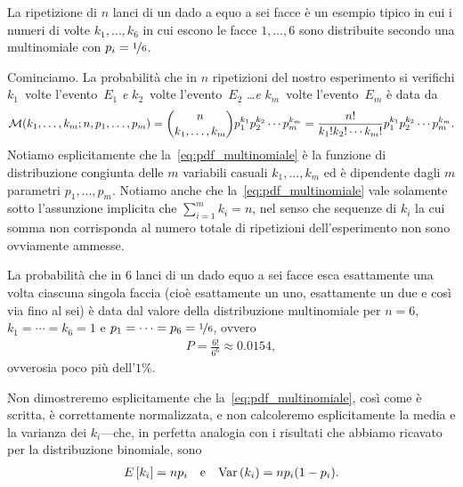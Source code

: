 \begin{examplebox}
  \begin{example}
    La ripetizione di $n$ lanci di un dado a equo a sei facce è un esempio
    tipico in cui i numeri di volte $k_1, \ldots, k_6$ in cui escono le facce
    $1, \ldots, 6$ sono distribuite secondo una multinomiale con
    $p_i = \nicefrac{1}{6}$.
  \end{example}
\end{examplebox}

Cominciamo. La probabilità che in $n$ ripetizioni del nostro esperimento
si verifichi $k_1$~volte l'evento~$E_1$ \emph{e} $k_2$~volte l'evento~$E_2$
\ldots \emph{e} $k_m$~volte l'evento~$E_m$ è data da
\begin{align}\label{eq:pdf_multinomiale}
  \multinomialpdf[n, p_1,\ldots, p_m]{k_1, \ldots, k_m} =
  \binom{n}{k_1, \ldots, k_m}p_1^{k_1}p_2^{k_2}\cdots p_m^{k_m} =
  \frac{n!}{k_1!k_2!\cdots k_m!}p_1^{k_1}p_2^{k_2}\cdots p_m^{k_m}.
\end{align}
Notiamo esplicitamente che la~\eqref{eq:pdf_multinomiale} è la funzione
di distribuzione congiunta delle $m$ variabili casuali $k_1,\ldots,k_m$ ed
è dipendente dagli $m$ parametri $p_1, \ldots, p_m$. Notiamo anche che
la~\eqref{eq:pdf_multinomiale} vale solamente sotto l'assunzione implicita
che $\sum_{i = 1}^m k_i = n$, nel senso che sequenze di $k_i$ la cui somma
non corrisponda al numero totale di ripetizioni dell'esperimento non sono
ovviamente ammesse.

\begin{examplebox}
  \begin{example}
    La probabilità che in $6$ lanci di un dado equo a sei facce esca
    esattamente una volta ciascuna singola faccia (cioè esattamente un uno,
    esattamente un due e così via fino al sei) è data dal valore della
    distribuzione multinomiale per $n = 6$, $k_1 = \cdots = k_6 = 1$ e
     $p_1 = \cdots = p_6 = \nicefrac{1}{6}$, ovvero
    \begin{align}
      P = \frac{6!}{6^6} \approx 0.0154,
    \end{align}
    ovverosia poco più dell'$1\%$.
  \end{example}
\end{examplebox}

Non dimostreremo esplicitamente che la~\eqref{eq:pdf_multinomiale}, così come
è scritta, è correttamente normalizzata, e non calcoleremo esplicitamente
la media e la varianza dei $k_i$---che, in perfetta analogia con i risultati che
abbiamo ricavato per la distribuzione binomiale, sono
\begin{align}
  \displaystyle E\left[k_i\right] = np_i \quad \text{e} \quad \text{Var}\left(k_i\right) = np_i(1 - p_i).
\end{align}

